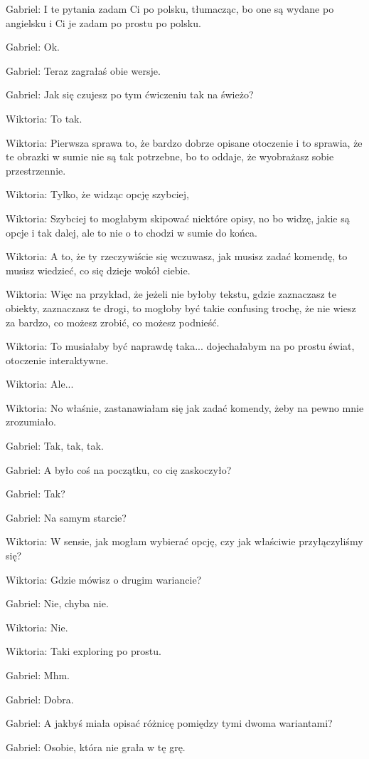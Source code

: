 Gabriel: I te pytania zadam Ci po polsku, tłumacząc, bo one są wydane po angielsku i Ci je zadam po prostu po polsku.

Gabriel: Ok.

Gabriel: Teraz zagrałaś obie wersje.

Gabriel: Jak się czujesz po tym ćwiczeniu tak na świeżo?

Wiktoria: To tak.

Wiktoria: Pierwsza sprawa to, że bardzo dobrze opisane otoczenie i to sprawia, że te obrazki w sumie nie są tak potrzebne, bo to oddaje, że wyobrażasz sobie przestrzennie.

Wiktoria: Tylko, że widząc opcję szybciej,

Wiktoria: Szybciej to mogłabym skipować niektóre opisy, no bo widzę, jakie są opcje i tak dalej, ale to nie o to chodzi w sumie do końca.

Wiktoria: A to, że ty rzeczywiście się wczuwasz, jak musisz zadać komendę, to musisz wiedzieć, co się dzieje wokół ciebie.

Wiktoria: Więc na przykład, że jeżeli nie byłoby tekstu, gdzie zaznaczasz te obiekty, zaznaczasz te drogi, to mogłoby być takie confusing trochę, że nie wiesz za bardzo, co możesz zrobić, co możesz podnieść.

Wiktoria: To musiałaby być naprawdę taka... dojechałabym na po prostu świat, otoczenie interaktywne.

Wiktoria: Ale...

Wiktoria: No właśnie, zastanawiałam się jak zadać komendy, żeby na pewno mnie zrozumiało.

Gabriel: Tak, tak, tak.

Gabriel: A było coś na początku, co cię zaskoczyło?

Gabriel: Tak?

Gabriel: Na samym starcie?

Wiktoria: W sensie, jak mogłam wybierać opcję, czy jak właściwie przyłączyliśmy się?

Wiktoria: Gdzie mówisz o drugim wariancie?

Gabriel: Nie, chyba nie.

Wiktoria: Nie.

Wiktoria: Taki exploring po prostu.

Gabriel: Mhm.

Gabriel: Dobra.

Gabriel: A jakbyś miała opisać różnicę pomiędzy tymi dwoma wariantami?

Gabriel: Osobie, która nie grała w tę grę.

